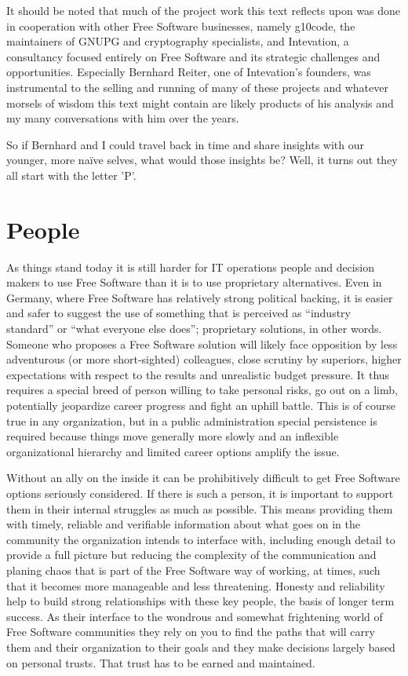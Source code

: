 It should be noted that much of the project work this text reflects upon was done in
cooperation with other Free Software businesses, namely g10code, the
maintainers of GNUPG and cryptography specialists, and Intevation, a consultancy focused
entirely on Free Software and its strategic challenges and opportunities. Especially
Bernhard Reiter, one of Intevation's founders, was instrumental to the selling and
running of many of these projects and whatever morsels of wisdom this text might contain
are likely products of his analysis and my many conversations with him over the years.

So if Bernhard and I could travel back in time and share insights with our younger, more
naïve selves, what would those insights be? Well, it turns out they all start with the
letter 'P'.

\section*{People}

As things stand today it is still harder for IT operations people and decision
makers to use Free Software than it is to use proprietary alternatives. Even in
Germany, where Free Software has relatively strong political backing, it is
easier and safer to suggest the use of something that is perceived as ``industry
standard'' or ``what everyone else does''; proprietary solutions, in other words.
Someone who proposes a Free Software solution will likely face opposition by
less adventurous (or more short-sighted) colleagues, close scrutiny by
superiors, higher expectations with respect to the results and unrealistic
budget pressure. It thus requires a special breed of person willing to take
personal risks, go out on a limb, potentially jeopardize career progress and
fight an uphill battle. This is of course true in any organization, but in a
public administration special persistence is required because things move
generally more slowly and an inflexible organizational hierarchy and limited
career options amplify the issue.

Without an ally on the inside it can be prohibitively difficult to get
Free Software options seriously considered. If there is such a person, it is important
to support them in their internal struggles as much as possible. This
means providing them with timely, reliable and verifiable information about
what goes on in the community the organization intends to interface with,
including enough detail to provide a full picture but reducing the
complexity of the communication and planing chaos that is part of the Free
Software way of working, at times, such that it becomes more manageable and
less threatening. Honesty and reliability help to build strong
relationships with these key people, the basis of longer term success. As
their interface to the wondrous and somewhat frightening world of Free
Software communities they rely on you to find the paths that will carry
them and their organization to their goals and they make decisions largely
based on personal trusts. That trust has to be earned and maintained.

